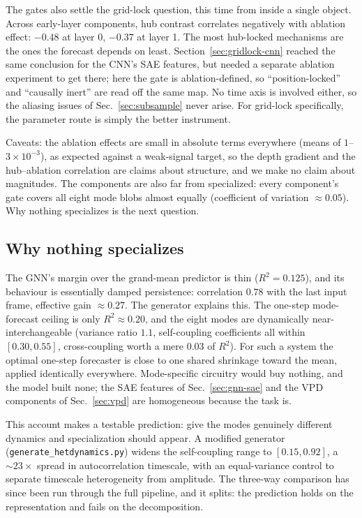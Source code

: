 The gates also settle the grid-lock question, this time from inside a single
object. Across early-layer components, hub contrast correlates negatively with
ablation effect: $-0.48$ at layer 0, $-0.37$ at layer 1. The most hub-locked
mechanisms are the ones the forecast depends on least. Section~\ref{sec:gridlock-cnn}
reached the same conclusion for the CNN's SAE features, but needed a separate
ablation experiment to get there; here the gate is ablation-defined, so
``position-locked'' and ``causally inert'' are read off the same map. No time
axis is involved either, so the aliasing issues of Sec.~\ref{sec:subsample} never
arise. For grid-lock specifically, the parameter route is simply the better
instrument.

Caveats: the ablation effects are small in absolute terms everywhere (means of
$1$--$3\times10^{-3}$), as expected against a weak-signal target, so the depth
gradient and the hub--ablation correlation are claims about structure, and we make
no claim about magnitudes. The components are also far from specialized: every
component's gate covers all eight mode blobs almost equally (coefficient of
variation ${\approx}0.05$). Why nothing specializes is the next question.

\subsection{Why nothing specializes}
\label{sec:homog}

The GNN's margin over the grand-mean predictor is thin ($R^2 = 0.125$), and its
behaviour is essentially damped persistence: correlation $0.78$ with the last
input frame, effective gain ${\approx}0.27$. The generator explains this. The
one-step mode-forecast ceiling is only $R^2 \approx 0.20$, and the eight modes are
dynamically near-interchangeable (variance ratio $1.1$, self-coupling
coefficients all within $[0.30, 0.55]$, cross-coupling worth a mere $0.03$ of
$R^2$). For such a system the optimal one-step forecaster is close to one shared
shrinkage toward the mean, applied identically everywhere. Mode-specific
circuitry would buy nothing, and the model built none; the SAE features of
Sec.~\ref{sec:gnn-sae} and the VPD components of Sec.~\ref{sec:vpd} are
homogeneous because the task is.

This account makes a testable prediction: give the modes genuinely different
dynamics and specialization should appear. A modified generator
(\texttt{generate\_hetdynamics.py}) widens the self-coupling range to
$[0.15, 0.92]$, a ${\sim}23\times$ spread in autocorrelation timescale, with an
equal-variance control to separate timescale heterogeneity from amplitude. The
three-way comparison has since been run through the full pipeline, and it splits:
the prediction holds on the representation and fails on the decomposition.

